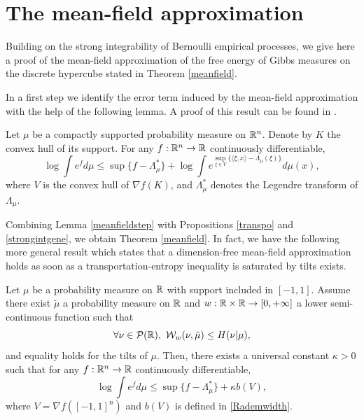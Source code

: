 \documentclass[a4paper,oneside,11pt]{article}
\begin{document}
\section{The mean-field approximation}
Building on the strong integrability of Bernoulli empirical processes, we give here a proof of the mean-field approximation of the free energy of Gibbs measures on the discrete hypercube stated in Theorem \ref{meanfield}.

In a first step we identify the error term induced by the mean-field approximation with the help of the following lemma. A proof of this result can be found in \cite[Proposition 1.1]{NL}.

\begin{Lem}\label{meanfieldstep}
Let $\mu$ be a compactly supported probability measure on $\mathbb{R}^n$. Denote by $K$ the convex hull of its support. For any $f :\mathbb{R}^n \to \mathbb{R}$ continuously differentiable,
$$ \log \int e^f d\mu \leq \sup\{ f- \Lambda^*_\mu\}+\log \int e^{\sup_{\xi \in V} \{ \langle\xi, x\rangle - \Lambda_\mu(\xi) \}} d\mu(x),$$
where $ V$ is the convex hull of $\nabla f(K)$, and $\Lambda^*_\mu$ denotes the Legendre transform of $\Lambda_\mu$.
\end{Lem}

Combining Lemma \ref{meanfieldstep} with Propositions \ref{transpo} and \ref{strongintgene}, we obtain Theorem \ref{meanfield}. In fact, we have the following more general result which states that a dimension-free mean-field approximation holds as soon as a transportation-entropy inequality is saturated by tilts exists.


\begin{Pro}
Let $\mu$ be a probability measure on $\mathbb{R}$ with support included in $[-1,1]$. 
Assume there exist $\tilde \mu$ a probability measure on $\mathbb{R}$ and $w : \mathbb{R}\times \mathbb{R} \to [0,+\infty]$ a lower semi-continuous function such that 
$$ \forall \nu \in \mathcal{P}(\RR), \ \mathcal{W}_w(\nu,\tilde \mu) \leq H(\nu | \mu),$$
and equality holds for the tilts of $\mu$. Then, there exists a universal constant $\kappa>0$ such that for any $f : \mathbb{R}^n \to \mathbb{R}$ continuously differentiable,
$$ \log \int e^f d\mu \leq \sup\{ f- \Lambda^*_{\mu}\} + \kappa b(V),$$
where $V = \nabla f([-1,1]^n)$ and $b(V)$ is defined in \eqref{Rademwidth}.
\end{Pro}
\end{document}
